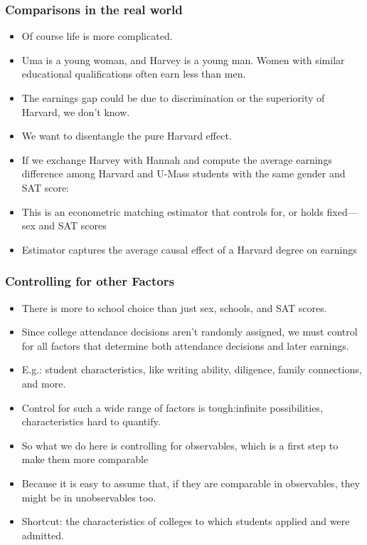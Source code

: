 \documentclass{beamer}
\begin{document}
\begin{frame}
\frametitle{Comparisons in the real world}
\begin{itemize}
	\item Of course life is more complicated. 
	\item Uma is a young woman, and Harvey is a young man. Women with similar educational qualifications often earn less than men.
	\item The earnings gap could be due to discrimination or the superiority of Harvard, we don’t know.
	\item We want to disentangle the pure Harvard effect.
	\item If we exchange Harvey with Hannah and compute the average earnings difference among Harvard and U-Mass students with the same gender and SAT score:
	\item This is an econometric matching estimator that controls for, or holds fixed—sex and SAT scores 	
	\item Estimator captures the average causal effect of a Harvard degree on earnings
\end{itemize}
\end{frame}
\begin{frame}
\frametitle{Controlling for other Factors}
\begin{itemize}
	\item There is more to school choice than just sex, schools, and SAT scores. 
	\item	Since college attendance decisions aren’t randomly assigned, we must control for all factors that determine both attendance decisions and later earnings. 
	\item E.g.: student characteristics, like writing ability, diligence, family connections, and more. 
	\item Control for such a wide range of factors is tough:infinite possibilities, characteristics hard to quantify.
	\item So what we do here is controlling for observables, which is a first step to make them more comparable
	\item Because it is easy to assume that, if they are comparable in observables, they might be in unobservables too.
	\item Shortcut: the characteristics of colleges to which students applied and were admitted.
\end{itemize}

\end{frame}
\end{document}
